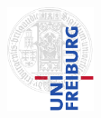 \begin{titlepage}

    \thispagestyle{empty}
    \renewcommand{\baselinestretch}{1.0}    %
    
    \begingroup    %
        \myfont
    
            \begin{center}
    
                \includegraphics[width = 2.55cm]{Graphics/UniFreiburgLogos/Classic.pdf}
                \vspace{20.8pt}


\end{center}
\end{titlepage}

